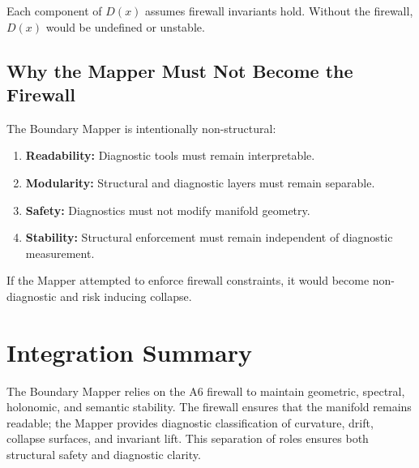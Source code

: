 Each component of $D(x)$ assumes firewall invariants hold. Without the
firewall, $D(x)$ would be undefined or unstable.

\subsection{Why the Mapper Must Not Become the Firewall}

The Boundary Mapper is intentionally non-structural:

\begin{enumerate}
    \item \textbf{Readability:} Diagnostic tools must remain interpretable.
    \item \textbf{Modularity:} Structural and diagnostic layers must remain
          separable.
    \item \textbf{Safety:} Diagnostics must not modify manifold geometry.
    \item \textbf{Stability:} Structural enforcement must remain independent
          of diagnostic measurement.
\end{enumerate}

If the Mapper attempted to enforce firewall constraints, it would become
non-diagnostic and risk inducing collapse.

\section{Integration Summary}

The Boundary Mapper relies on the A6 firewall to maintain geometric,
spectral, holonomic, and semantic stability. The firewall ensures that the
manifold remains readable; the Mapper provides diagnostic classification of
curvature, drift, collapse surfaces, and invariant lift. This separation of
roles ensures both structural safety and diagnostic clarity.

